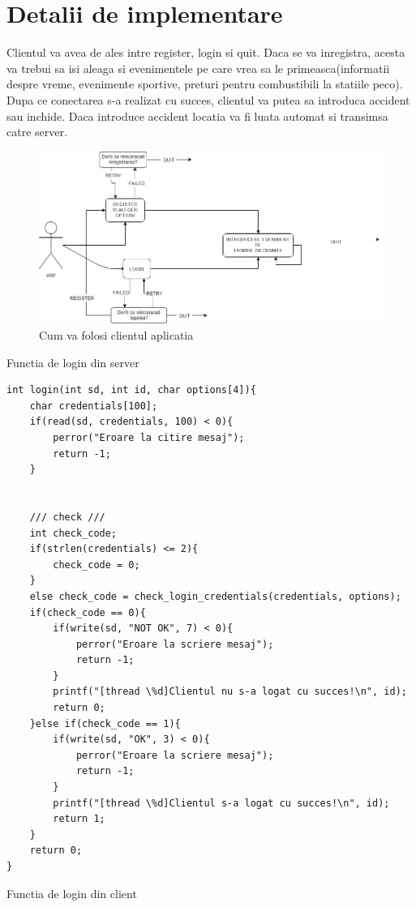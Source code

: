 \documentclass[runningheads]{llncs}
\begin{document}
\section {Detalii de implementare}
Clientul va avea de ales intre register, login si quit. Daca se va inregistra, acesta va trebui sa isi aleaga si evenimentele pe care vrea sa le primeasca(informatii despre vreme, evenimente sportive, preturi pentru combustibili la statiile peco). Dupa ce conectarea s-a realizat cu succes, clientul va putea sa introduca accident sau inchide. Daca introduce accident locatia va fi luata automat si transimsa catre server.\\
\begin{figure}[H]
\includegraphics[width=\textwidth]{use-case.jpg}
\caption{Cum va folosi clientul aplicatia}
\end{figure}
Functia de login din server
\begin{lstlisting}
int login(int sd, int id, char options[4]){
    char credentials[100];
    if(read(sd, credentials, 100) < 0){
        perror("Eroare la citire mesaj");
        return -1;
    }
    

    /// check ///
    int check_code;
    if(strlen(credentials) <= 2){
        check_code = 0;
    }
    else check_code = check_login_credentials(credentials, options);
    if(check_code == 0){
        if(write(sd, "NOT OK", 7) < 0){
            perror("Eroare la scriere mesaj");
            return -1;
        }
        printf("[thread \%d]Clientul nu s-a logat cu succes!\n", id);
        return 0;
    }else if(check_code == 1){
        if(write(sd, "OK", 3) < 0){
            perror("Eroare la scriere mesaj");
            return -1;
        }
        printf("[thread \%d]Clientul s-a logat cu succes!\n", id);
        return 1;
    }
    return 0;
}
\end{lstlisting}
Functia de login din client
\end{document}
